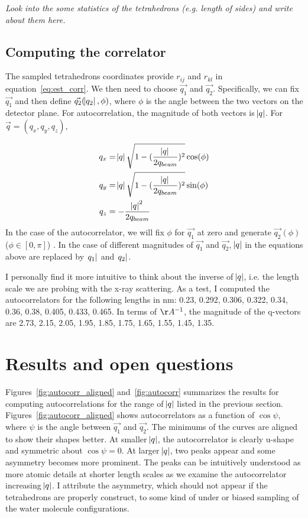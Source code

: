 \documentclass[20pt]{article}
\begin{document}
{\it Look into the some statistics of the tetrahedrons (e.g. length of sides) and write about them here. }

\subsection{Computing the correlator}
The sampled tetrahedrons coordinates provide $r_{ij}$ and $r_{kl}$ in equation~\ref{eq:est_corr}. We then need to choose $\vec{q_1}$ and $\vec{q_2}$. Specifically, we can fix $\vec{q_1}$ and then define $\vec{q_2}(\abs{q_2},\phi)$, where $\phi$ is the angle between the two vectors on the detector plane. For autocorrelation, the magnitude of both vectors is $\abs{q}$. For $\vec{q} = (q_x,q_y,q_z)$,

\begin{align}
q_x &= \abs{q}\sqrt{1-(\frac{\abs{q}}{2q_{beam}})^2} \cos(\phi) \\
q_y &= \abs{q}\sqrt{1-(\frac{\abs{q}}{2q_{beam}})^2} \sin(\phi) \\
q_z &= -\frac{\abs{q}^2}{2q_{beam}} 
\end{align}
In the case of the autocorrelator, we will fix $\phi$ for $\vec{q_1}$ at zero and generate $\vec{q_2}(\phi)$ ($\phi \in [0 , \pi]$) . In the case of different magnitudes of $\vec{q_1}$ and $\vec{q_2}$, $\abs{q}$ in the equations above are replaced by $\abs{q_1}$ and $\abs{q_2}$.

I personally find it more intuitive to think about the inverse of $\abs{q}$, i.e. the length scale we are probing with the x-ray scattering. As a test, I computed the autocorrelators for the following lengths in nm: 0.23, 0.292, 0.306, 0.322, 0.34, 0.36, 0.38, 0.405, 0.433, 0.465. In terms of $\AA^{-1}$, the magnitude of the q-vectors are 2.73, 2.15,  2.05, 1.95, 1.85, 1.75, 1.65, 1.55, 1.45, 1.35.

\section{Results and open questions}
Figures~\ref{fig:autocorr_aligned} and~\ref{fig:autocorr} summarizes the results for computing autocorrelations for the range of $\abs{q}$ listed in the previous section. Figures~\ref{fig:autocorr_aligned} shows autocorrelators as a function of $\cos{\psi}$, where $\psi$ is the angle between $\vec{q_1}$ and $\vec{q_2}$. The minimums of the curves are aligned to show their shapes better. At smaller $\abs{q}$, the autocorrelator is clearly u-shape and symmetric about $\cos{\psi} = 0$. At larger $\abs{q}$, two peaks appear and some asymmetry becomes more prominent. The peaks can be intuitively understood as more atomic details at shorter length scales as we examine the autocorrelator increasing $\abs{q}$. I attribute the asymmetry, which should not appear if the tetrahedrons are properly construct, to some kind of under or biased sampling of the water molecule configurations. 
\end{document}
